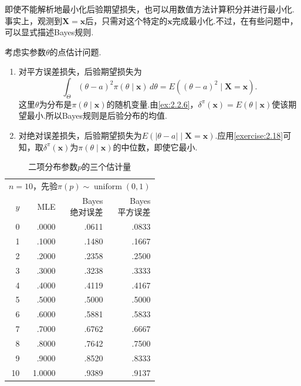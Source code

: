 即使不能解析地最小化后验期望损失，也可以用数值方法计算积分并进行最小化.事实上，观测到$\boldsymbol X=\boldsymbol x$后，只需对这个特定的$\boldsymbol x$完成最小化.不过，在有些问题中，可以显式描述Bayes规则.
\begin{example}[两种Bayes规则]\label{ex:7.3.28}
考虑实参数$\theta$的点估计问题.
\begin{enumerate}[label=(\alph*)]
\item 对平方误差损失，后验期望损失为
$$\int_\Theta(\theta-a)^2\pi(\theta\mid\boldsymbol x)\,d\theta=E((\theta-a)^2\mid\boldsymbol X=\boldsymbol x).$$
这里$\theta$为分布是$\pi(\theta\mid\boldsymbol x)$的随机变量.由\autoref{ex:2.2.6}，$\delta^\pi(\boldsymbol x)=E(\theta\mid\boldsymbol x)$使该期望最小.所以Bayes规则是后验分布的均值.
\item 对绝对误差损失，后验期望损失为$E(|\theta-a|\mid\boldsymbol X=\boldsymbol x)$.应用\autoref{exercise:2.18}可知，取$\delta^\pi(\boldsymbol x)$为$\pi(\theta\mid\boldsymbol x)$的中位数，即使它最小.
\end{enumerate}
\end{example}
\begin{table}[H]
\centering
\caption{二项分布参数$p$的三个估计量}\label{tab:7.3.1}
\begin{tabular}{rrrr}
\hline
\multicolumn{4}{c}{$n=10$，先验$\pi(p)\sim\operatorname{uniform}(0,1)$}\\
$y$&MLE&\shortstack{Bayes\\绝对误差}&\shortstack{Bayes\\平方误差}\\\hline
0&.0000&.0611&.0833\\
1&.1000&.1480&.1667\\
2&.2000&.2358&.2500\\
3&.3000&.3238&.3333\\
4&.4000&.4119&.4167\\
5&.5000&.5000&.5000\\
6&.6000&.5881&.5833\\
7&.7000&.6762&.6667\\
8&.8000&.7642&.7500\\
9&.9000&.8520&.8333\\
10&1.0000&.9389&.9137\footnotemark\\\hline
\end{tabular}
\end{table}
